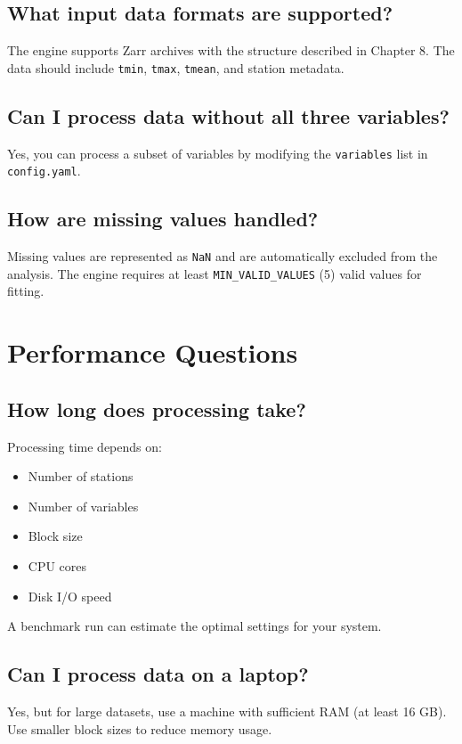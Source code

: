 ﻿\documentclass[12pt,a4paper]{report}
\begin{document}
\subsection{What input data formats are supported?}
The engine supports Zarr archives with the structure described in Chapter 8. The data should include \texttt{tmin}, \texttt{tmax}, \texttt{tmean}, and station metadata.

\subsection{Can I process data without all three variables?}
Yes, you can process a subset of variables by modifying the \texttt{variables} list in \texttt{config.yaml}.

\subsection{How are missing values handled?}
Missing values are represented as \texttt{NaN} and are automatically excluded from the analysis. The engine requires at least \texttt{MIN\_VALID\_VALUES} (5) valid values for fitting.

\section{Performance Questions}

\subsection{How long does processing take?}
Processing time depends on:
\begin{itemize}
    \item Number of stations
    \item Number of variables
    \item Block size
    \item CPU cores
    \item Disk I/O speed
\end{itemize}
A benchmark run can estimate the optimal settings for your system.

\subsection{Can I process data on a laptop?}
Yes, but for large datasets, use a machine with sufficient RAM (at least 16 GB). Use smaller block sizes to reduce memory usage.
\end{document}
